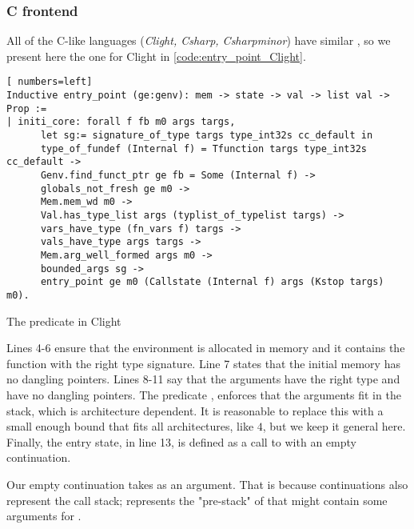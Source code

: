 \subsubsection{C frontend}
All of the C-like languages (\emph{Clight, Csharp, Csharpminor}) have similar , so we present here the one for Clight in \ref{code:entry_point_Clight}.
\begin{table}
\begin{lstlisting}[ numbers=left]
Inductive entry_point (ge:genv): mem -> state -> val -> list val -> Prop :=
| initi_core: forall f fb m0 args targs,
      let sg:= signature_of_type targs type_int32s cc_default in
      type_of_fundef (Internal f) = Tfunction targs type_int32s cc_default ->
      Genv.find_funct_ptr ge fb = Some (Internal f) ->
      globals_not_fresh ge m0 ->
      Mem.mem_wd m0 ->
      Val.has_type_list args (typlist_of_typelist targs) ->
      vars_have_type (fn_vars f) targs ->
      vals_have_type args targs ->
      Mem.arg_well_formed args m0 ->
      bounded_args sg ->
      entry_point ge m0 (Callstate (Internal f) args (Kstop targs) m0).
\end{lstlisting}
\caption{The  predicate in Clight}\label{code:entry_point_Clight}
\end{table}
Lines 4-6 ensure that the environment is allocated in memory and it contains the function  with the right type signature. Line 7 states that the initial memory has no dangling pointers. Lines 8-11 say that the arguments have the right type and have no dangling pointers. The predicate , enforces that the arguments fit in the stack, which is architecture dependent. It is reasonable to replace this with a small enough bound that fits all architectures, like $4$, but we keep it general here. Finally, the entry state, in line 13, is defined as a call to  with an empty continuation.

Our empty continuation  takes  as an argument. That is because continuations also represent the call stack;  represents the "pre-stack" of  that might contain some arguments for .

